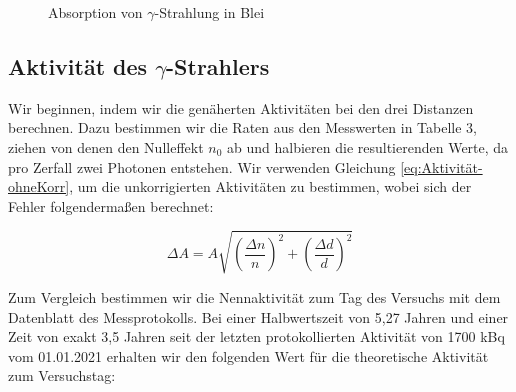 \documentclass{article}
\begin{document}
\begin{figure}[!b]
    \centering
    \caption{Absorption von $\gamma$-Strahlung in Blei}
    \label{fig:A4-AbsorptionGamma}
\end{figure}

\clearpage
\newpage

\subsection{Aktivität des $\gamma$-Strahlers}

Wir beginnen, indem wir die genäherten Aktivitäten bei den drei Distanzen berechnen. Dazu bestimmen wir die Raten aus den Messwerten in Tabelle 3, ziehen von denen den Nulleffekt $n_0$ ab und halbieren die resultierenden Werte, da pro Zerfall zwei Photonen entstehen. Wir verwenden Gleichung \ref{eq:Aktivität-ohneKorr}, um die unkorrigierten Aktivitäten zu bestimmen, wobei sich der Fehler folgendermaßen berechnet:

\begin{equation}
    \Delta A = A \sqrt{\left(\frac{\Delta n}{n}\right)^2 + \left(\frac{\Delta d}{d}\right)^2}
\end{equation}

Zum Vergleich bestimmen wir die Nennaktivität zum Tag des Versuchs mit dem Datenblatt des Messprotokolls. Bei einer Halbwertszeit von 5,27 Jahren und einer Zeit von exakt 3,5 Jahren seit der letzten protokollierten Aktivität von 1700 kBq vom 01.01.2021 erhalten wir den folgenden Wert für die theoretische Aktivität zum Versuchstag:
\end{document}
